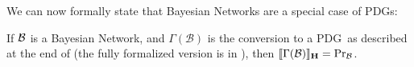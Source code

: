 \documentclass{article}
\newcommand\MaxEnt{_{\mathbf H}}
\newcommand{\MN}{PDG}
\newcommand{\MNs}{\MN s}
\numberwithin{equation}{section}
\begin{document}
\begin{notfocus}
	
%		
	


	



	We can now formally state that Bayesian Networks are a special case of \MNs: 
	\begin{theorem}[restate=thmbnsRpdgs]\label{thm:bns-are-pdgs}
		If $\cal B$ is a Bayesian Network, and $\Gamma(\mathcal B)$ is the conversion to a \MN\ as described at the end of  (the fully formalized version is in ), then $\bbr{\Gamma(\mathcal B)}\MaxEnt = \Pr_{\cal B}$.
	\end{theorem}


\end{notfocus}
\end{document}
